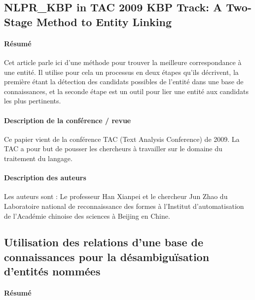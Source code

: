 \documentclass{article}
\begin{document}
\subsection{NLPR\_KBP in TAC 2009 KBP Track: A Two-Stage Method to Entity Linking\cite{article-10}}

\paragraph{Résumé}

Cet article parle ici d’une méthode pour trouver la meilleure correspondance à une entité. Il utilise pour cela un processus en deux étapes qu’ils décrivent, la première étant la détection des candidats possibles de l’entité dans une base de connaissances, et la seconde étape est un outil pour lier une entité aux candidats les plus pertinents.


\paragraph{Description de la conférence / revue}

Ce papier vient de la conférence TAC (Text Analysis Conference) de 2009. La TAC a pour but de pousser les chercheurs à travailler sur le domaine du traitement du langage.


\paragraph{Description des auteurs}

Les auteurs sont : Le professeur Han Xianpei et le chercheur Jun Zhao du Laboratoire national de reconnaissance des formes à l'Institut d'automatisation de l'Académie chinoise des sciences à Beijing en Chine.


\subsection{Utilisation des relations d’une base de connaissances pour la désambiguïsation d’entités nommées\cite{article-11}}

\paragraph{Résumé}
\end{document}
